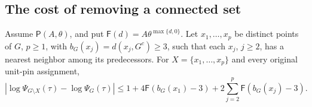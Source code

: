 \subsection{The cost of removing a connected set}

\begin{lemma}\label{l:removal}
Assume \(\mathsf P(A,\theta)\), and put
\(\mathsf F(d)=A\theta^{\max\{d,0\}}\).
Let \(x_1,\ldots,x_p\) be distinct points of \(G\), \(p\ge1\),
with \(b_G(x_j)=d(x_j,G^c)\ge3\), such that each \(x_j\), \(j\ge2\),
has a nearest neighbor among its predecessors.
For \(X=\{x_1,\ldots,x_p\}\) and every original unit-pin assignment,
\[
 |\log\Psi_{G\setminus X}(\tau)-\log\Psi_G(\tau)|
 \le1+4\mathsf F(b_G(x_1)-3)
                  +2\sum_{j=2}^p\mathsf F(b_G(x_j)-3).
\]
\end{lemma}

